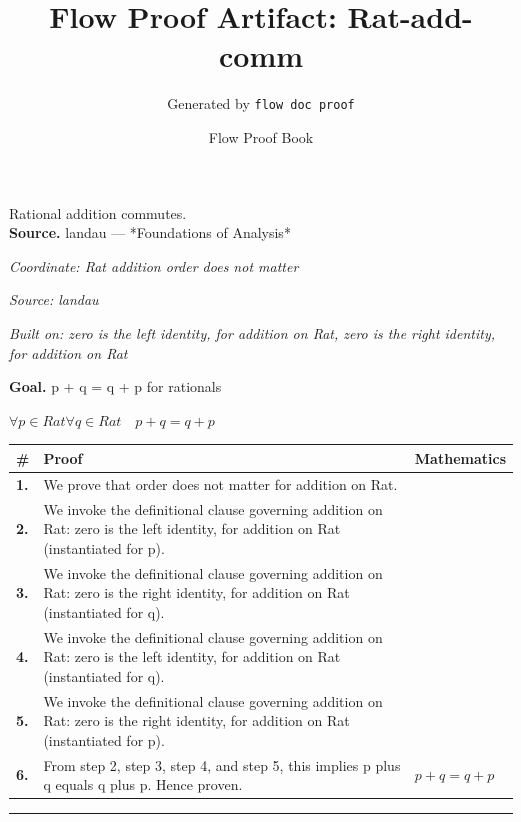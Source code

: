 \documentclass[11pt]{article}
\title{Flow Proof Artifact: Rat-add-comm}
\author{Generated by \texttt{flow doc proof}}
\date{Flow Proof Book}
\theoremstyle{definition}
\begin{document}
\maketitle
Rational addition commutes.\\[0.5em]
\textbf{Source.} landau — *Foundations of Analysis*\\[0.5em]
\bigskip
{}\par
\smallskip\noindent\textit{Coordinate: Rat \cdot addition \cdot order does not matter}\par
\smallskip\noindent\textit{Source: landau}\par
\smallskip\noindent\textit{Built on: zero is the left identity, for addition on Rat, zero is the right identity, for addition on Rat}\par
\medskip
\noindent\textbf{Goal.} p + q = q + p for rationals\par
\noindent$\displaystyle \forall p \in Rat \forall q \in Rat\quad p + q = q + p$\par
\medskip
\noindent
\begin{tabular}{@{} >{\raggedright\arraybackslash}p{} >{\raggedright\arraybackslash}p{} >{\raggedleft\arraybackslash}p{} @{}}
\textbf{\#} & \textbf{Proof} & \textbf{Mathematics} \\
\midrule
\textbf{1.} & We prove that order does not matter for addition on Rat. & \\[0.45em]
\textbf{2.} & We invoke the definitional clause governing addition on Rat: zero is the left identity, for addition on Rat (instantiated for p). & \\[0.45em]
\textbf{3.} & We invoke the definitional clause governing addition on Rat: zero is the right identity, for addition on Rat (instantiated for q). & \\[0.45em]
\textbf{4.} & We invoke the definitional clause governing addition on Rat: zero is the left identity, for addition on Rat (instantiated for q). & \\[0.45em]
\textbf{5.} & We invoke the definitional clause governing addition on Rat: zero is the right identity, for addition on Rat (instantiated for p). & \\[0.45em]
\textbf{6.} & From step 2, step 3, step 4, and step 5, this implies p plus q equals q plus p. Hence proven. & $\displaystyle p + q = q + p$ \\[0.45em]
\bottomrule
\end{tabular}
\label{thm:Rat-addition-order_does_not_matter}
\par\medskip\hrule
\end{document}
